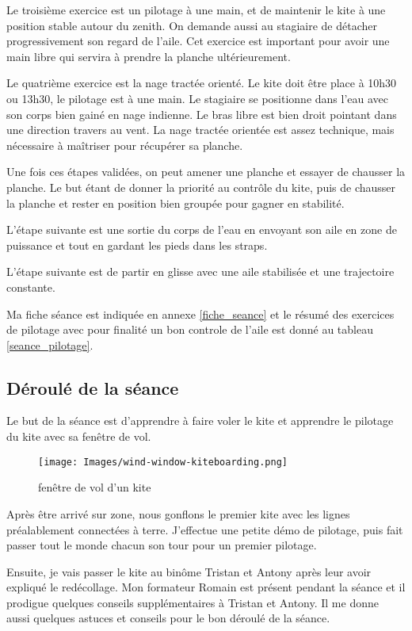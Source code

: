 \documentclass[11pt,a4paper]{report}
\begin{document}
Le troisième exercice est un pilotage à une main, et 
de maintenir le kite à une position stable autour
du zenith. On demande aussi au stagiaire de
détacher progressivement son regard de l'aile.
Cet exercice est important pour avoir une main libre
qui servira à prendre la planche ultérieurement.

Le quatrième exercice est la nage tractée orienté.
Le kite doit être place à 10h30 ou 13h30, le pilotage
est à une main. Le stagiaire se positionne dans l'eau
avec son corps bien gainé en nage indienne. Le bras
libre est bien droit pointant dans une direction 
travers au vent. La nage tractée orientée est assez
technique, mais nécessaire à maîtriser pour récupérer 
sa planche.

Une fois ces étapes validées, on peut
amener une planche et essayer de chausser la planche.
Le but étant de donner la priorité au contrôle du kite, 
puis de chausser la planche et rester en position bien 
groupée pour gagner en stabilité.


L'étape suivante est une sortie du corps de l'eau
en envoyant son aile en zone de puissance et tout en 
gardant les pieds dans les straps. 

L'étape suivante est de partir en glisse avec
une aile stabilisée et une trajectoire constante.

Ma fiche séance est indiquée en annexe \ref{fiche_seance}
et le résumé des exercices de pilotage avec pour
finalité un bon controle de l'aile est donné
au tableau \ref{seance_pilotage}.

\subsection{Déroulé de la séance}
Le but de la séance est d'apprendre à faire voler le kite et
apprendre le pilotage du kite avec sa fen\^etre de vol.
\begin{figure}
\centering
\texttt{[image: Images/wind-window-kiteboarding.png]}
\caption{fen\^etre de vol d'un kite\label{fenetre}}
\end{figure} 

Après \^etre arrivé sur zone, nous gonflons le premier kite avec les
lignes préalablement connectées à terre. J'effectue une petite démo
de pilotage, puis fait passer tout le monde chacun son tour pour
un premier pilotage.

Ensuite, je vais passer le kite au binôme Tristan et Antony après leur
avoir expliqué le redécollage. Mon formateur Romain est présent pendant la
séance et il prodigue quelques conseils supplémentaires à Tristan et Antony.
Il me donne aussi quelques astuces et conseils pour le bon déroulé de la séance.
\end{document}
